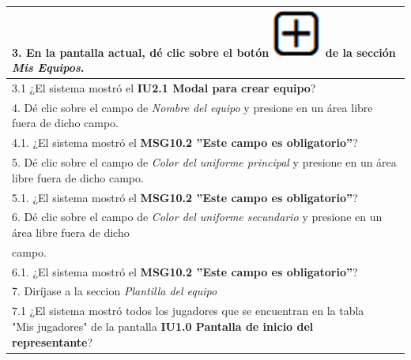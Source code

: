 \documentclass[oneside,10pt]{book}
\begin{document}
\begin{tabularx}{\textwidth}{ X l l X }
\multicolumn{4}{|l|}{3. En la pantalla actual, dé clic sobre el botón \includegraphics[scale=.3]{images/add} de la sección \textit{Mis Equipos}.} \\ \hline
\multicolumn{1}{|X|}{3.1 ¿El sistema mostró el \textbf{IU2.1 Modal para crear equipo}?} & \multicolumn{1}{l|}{}   & \multicolumn{1}{l|}{}   & \multicolumn{1}{X|}{}              \\ \hline

\multicolumn{4}{|l|}{4. Dé clic sobre el campo de \textit{Nombre del equipo} y presione en un área libre fuera de dicho campo.}              \\ \hline
\multicolumn{1}{|X|}{4.1. ¿El sistema mostró el \textbf{MSG10.2 ''Este campo es obligatorio''}?} & \multicolumn{1}{l|}{}   & \multicolumn{1}{l|}{}   & \multicolumn{1}{X|}{}              \\ \hline

\multicolumn{4}{|l|}{5. Dé clic sobre el campo de \textit{Color del uniforme principal} y presione en un área libre fuera de dicho campo.}              \\ \hline
\multicolumn{1}{|X|}{5.1. ¿El sistema mostró el \textbf{MSG10.2 ''Este campo es obligatorio''}?} & \multicolumn{1}{l|}{}   & \multicolumn{1}{l|}{}   & \multicolumn{1}{X|}{}              \\ \hline

\multicolumn{4}{|l|}{6. Dé clic sobre el campo de \textit{Color del uniforme secundario} y presione en un área libre fuera de dicho}              \\
\multicolumn{4}{|l|}{campo.}              \\ \hline
\multicolumn{1}{|X|}{6.1. ¿El sistema mostró el \textbf{MSG10.2 ''Este campo es obligatorio''}?} & \multicolumn{1}{l|}{}   & \multicolumn{1}{l|}{}   & \multicolumn{1}{X|}{}              \\ \hline

\multicolumn{4}{|l|}{7. Diríjase a la seccion \textit{Plantilla del equipo}}              \\ \hline
\multicolumn{1}{|X|}{7.1 ¿El sistema mostró todos los jugadores que se encuentran en la tabla "Mis jugadores" de la pantalla \textbf{IU1.0 Pantalla de inicio del representante}?} & \multicolumn{1}{l|}{}   & \multicolumn{1}{l|}{}   & \multicolumn{1}{X|}{}              \\ \hline


\end{tabularx}
\end{document}
